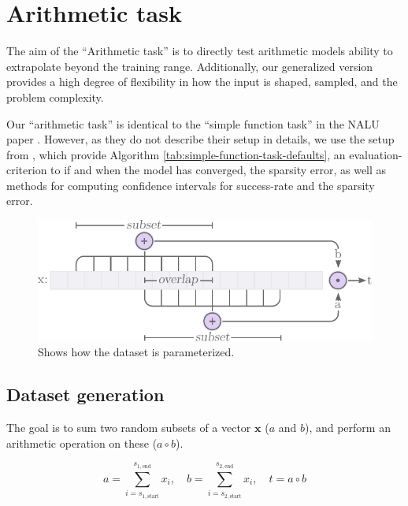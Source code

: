 \section{Arithmetic task}

The aim of the ``Arithmetic task'' is to directly test arithmetic models ability to extrapolate beyond the training range. Additionally, our generalized version provides a high degree of flexibility in how the input is shaped, sampled, and the problem complexity.

Our ``arithmetic task'' is identical to the ``simple function task'' in the NALU paper \cite{trask-nalu}. However, as they do not describe their setup in details, we use the setup from \citet{maep-madsen-johansen-2019}, which provide Algorithm \ref{tab:simple-function-task-defaults}, an evaluation-criterion to if and when the model has converged, the sparsity error, as well as methods for computing confidence intervals for success-rate and the sparsity error.

\begin{figure}[h]
\centering
\includegraphics[scale=0.7]{graphics/function_task_static_problem.pdf}
\caption{Shows how the dataset is parameterized.}
\label{fig:simple-function-task-problem}
\end{figure}

\subsection{Dataset generation}
\label{sec:appendix:simple-function-task:data-generation}

The goal is to sum two random subsets of a vector $\mathbf{x}$ ($a$ and $b$), and perform an arithmetic operation on these ($a \circ b$).

\begin{equation}
    a = \sum_{i=s_{1,\mathrm{start}}}^{s_{1,\mathrm{end}}} x_i, \quad b = \sum_{i=s_{2,\mathrm{start}}}^{s_{2,\mathrm{end}}} x_i, \quad t = a \circ b
\end{equation}

